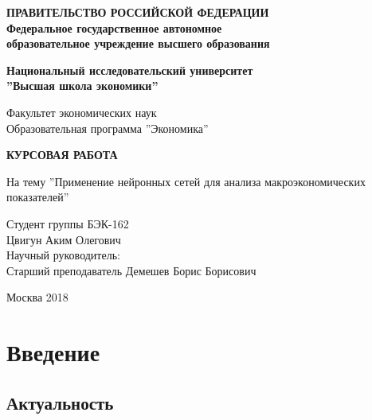 \documentclass[12pt, a4paper]{article}
\begin{document}
\thispagestyle{empty}
\begin{center}
	\textbf{ПРАВИТЕЛЬСТВО РОССИЙСКОЙ ФЕДЕРАЦИИ}\\
	\vspace{2ex}
	\textbf{Федеральное государственное автономное\\ образовательное учреждение высшего образования}

	\vspace{2ex}

	\textbf{Национальный исследовательский университет \\ ''Высшая школа экономики''}

	\vspace{8ex}
	\begin{flushright}
	Факультет экономических наук\\
	Образовательная программа ''Экономика''
	\end{flushright}
\end{center}
\vspace{9ex}

\begin{center}
	{\textbf{КУРСОВАЯ РАБОТА
	}}
	\vspace{1ex}

	На тему ''Применение нейронных сетей для анализа макроэкономических показателей''
\end{center}
	\vspace{1ex}
\begin{flushright}
	\noindent
	Студент группы БЭК-162\\Цвигун Аким Олегович\\
	\vspace{13ex}
	Научный руководитель:\\
	Старший преподаватель Демешев Борис Борисович

\end{flushright}

	\vfill

\begin{center}
		Москва 2018

\end{center}
\newpage
\tableofcontents
\clearpage
\section{Введение}

\subsection{Актуальность}
\end{document}
